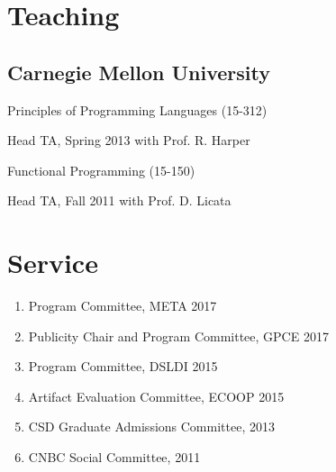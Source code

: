 \documentclass[10pt,letterpaper]{article}
\renewenvironment{itemize}{
  \begin{list}{}{
    \setlength{\leftmargin}{1.5em}
    \setlength{\itemsep}{0.25em}
    \setlength{\parskip}{0pt}
    \setlength{\parsep}{0.25em}
  }
}{
  \end{list}
}
\begin{document}
%


\section*{Teaching}
\subsection*{Carnegie Mellon University}
\begin{itemize}
  \item Principles of Programming Languages (15-312)
    \begin{itemize}
      \item Head TA, Spring 2013 with Prof. R. Harper
    \end{itemize}
  \item Functional Programming (15-150)
    \begin{itemize}
      \item Head TA, Fall 2011 with Prof. D. Licata
    \end{itemize}
\end{itemize}

\section*{Service}
\begin{enumerate}
  \item Program Committee, META 2017
  \item Publicity Chair and Program Committee, GPCE 2017
  \item Program Committee, DSLDI 2015
  \item Artifact Evaluation Committee, ECOOP 2015
  \item CSD Graduate Admissions Committee, 2013
  \item CNBC Social Committee, 2011
\end{enumerate}
\end{document}
